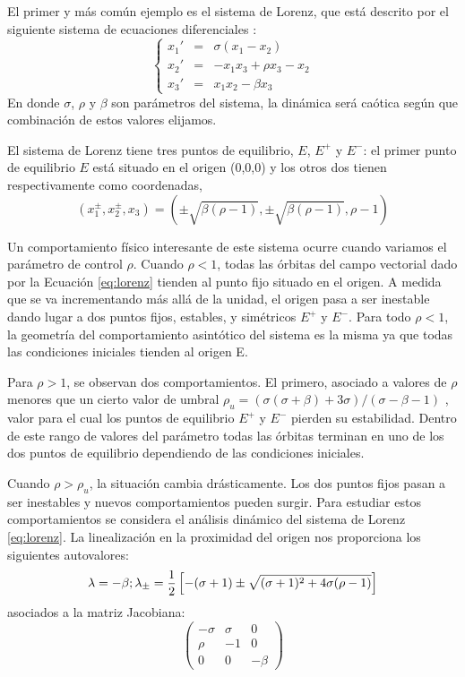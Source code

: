 El primer y más común ejemplo es el sistema de Lorenz, que está descrito por el siguiente sistema de ecuaciones diferenciales \cite{Lorenz1963}:
\begin{equation}\label{eq:lorenz}
\left \{
\begin{array}{rcl}
x_1' &=& \sigma (x_1-x_2)\\
x_2' &=& -x_1x_3+\rho x_3-x_2\\
x_3' &=& x_1x_2-\beta x_3
\end{array}
\right.
\end{equation}
En donde $\sigma$, $\rho$ y $\beta$ son parámetros del sistema, la dinámica será caótica según que combinación de estos valores elijamos.

El sistema de Lorenz tiene tres puntos de equilibrio, $E$, $E^+$ y $E^-$: el primer punto de equilibrio $E$ está situado en el origen (0,0,0) y los otros dos tienen respectivamente como coordenadas,
\begin{equation}
(x_1^\pm,x_2^\pm,x_3)=\left(\pm \sqrt{\beta(\rho-1)},\pm \sqrt{\beta(\rho-1)},\rho - 1\right) \nonumber
\end{equation}


Un comportamiento físico interesante de este sistema ocurre cuando variamos el parámetro de control $\rho$.
Cuando $\rho<1$, todas las órbitas del campo vectorial dado por la Ecuación \ref{eq:lorenz} tienden al punto fijo situado en el origen.
A medida que se va incrementando más allá de la unidad, el origen pasa a ser inestable dando lugar a dos puntos fijos, estables, y simétricos $E^+$ y $E^-$. Para todo $\rho<1$, la geometría del comportamiento asintótico del sistema es la misma ya que todas las condiciones iniciales tienden al origen E.

Para $\rho>1$, se observan dos comportamientos.
El primero, asociado a valores de $\rho$ menores que un cierto valor de umbral $\rho_u=(\sigma(\sigma+\beta)+3\sigma)/(\sigma-\beta-1)$ , valor para el cual los puntos de equilibrio $E^+$ y $E^-$ pierden su estabilidad.
Dentro de este rango de valores del parámetro todas las órbitas terminan en uno de los dos puntos de equilibrio dependiendo de las condiciones iniciales.

Cuando $\rho>\rho_u$, la situación cambia drásticamente.
Los dos puntos fijos pasan a ser inestables y nuevos comportamientos pueden surgir.
Para estudiar estos comportamientos se considera el análisis dinámico del sistema de Lorenz \ref{eq:lorenz}. 
La linealización en la proximidad del origen nos proporciona los siguientes autovalores:
\begin{equation}
\lambda = -\beta;\\
\lambda_\pm = \frac{1}{2} \left[-(\sigma+1) \pm \sqrt{(\sigma+1)^2+4\sigma(\rho-1)} \right] \nonumber
\end{equation}
 asociados a la matriz Jacobiana:
\begin{equation}
\begin{pmatrix}
-\sigma &\sigma &0 \\
\rho &-1 &0 \\
0 &0 &-\beta
\end{pmatrix}
\nonumber
\end{equation}

